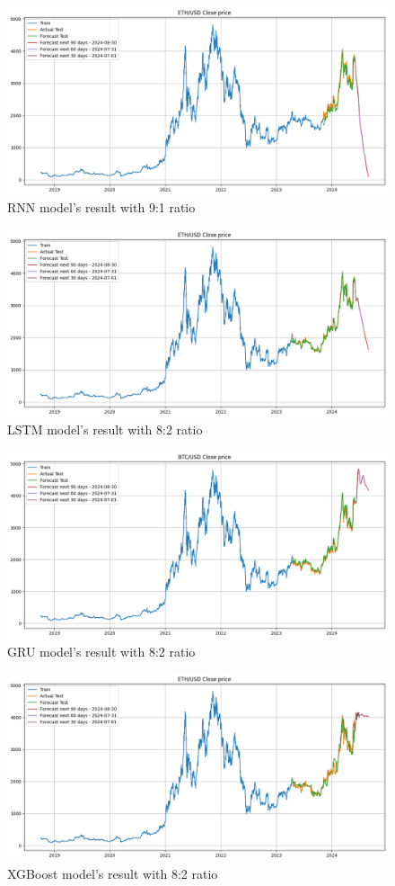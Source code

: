 \documentclass{ieeeojies}
\begin{document}
\begin{figure}[H]
    \centering 
    \includegraphics[width=0.8\linewidth]{./././visualize/RNN/ETH-90-10.png} 
    \caption{RNN model’s result with 9:1 ratio}
    \label{fig:24}
\end{figure}
\begin{figure}[H]
    \centering 
    \includegraphics[width=0.8\linewidth]{./././visualize/LSTM/ETH-80-20.png} 
    \caption{LSTM model’s result with 8:2 ratio}
    \label{fig:25}
\end{figure}
\begin{figure}[H]
    \centering 
    \includegraphics[width=0.8\linewidth]{./././visualize/GRU/ETH-80-20.png} 
    \caption{GRU model’s result with 8:2 ratio}
    \label{fig:26}
\end{figure}
\begin{figure}[H]
    \centering 
    \includegraphics[width=0.8\linewidth]{./././visualize/XGBoost/ETH-80-20.png} 
    \caption{XGBoost model’s result with 8:2 ratio}
    \label{fig:27}
\end{figure}
\end{document}
